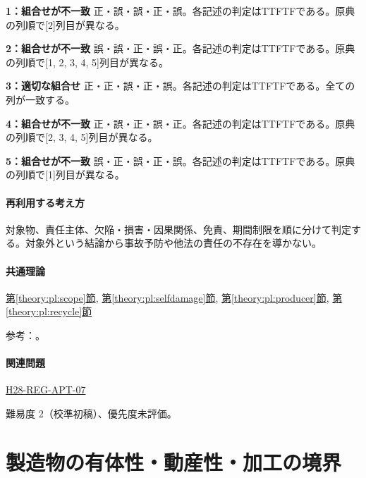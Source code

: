 \noindent\textbf{1：組合せが不一致} 正・誤・誤・正・誤。各記述の判定はTTFTFである。原典の列順で[2]列目が異なる。\par

\noindent\textbf{2：組合せが不一致} 誤・誤・正・誤・正。各記述の判定はTTFTFである。原典の列順で[1, 2, 3, 4, 5]列目が異なる。\par

\noindent\textbf{3：適切な組合せ} 正・正・誤・正・誤。各記述の判定はTTFTFである。全ての列が一致する。\par

\noindent\textbf{4：組合せが不一致} 正・誤・正・誤・正。各記述の判定はTTFTFである。原典の列順で[2, 3, 4, 5]列目が異なる。\par

\noindent\textbf{5：組合せが不一致} 誤・正・誤・正・誤。各記述の判定はTTFTFである。原典の列順で[1]列目が異なる。\par

\paragraph{再利用する考え方} 対象物、責任主体、欠陥・損害・因果関係、免責、期間制限を順に分けて判定する。対象外という結論から事故予防や他法の責任の不存在を導かない。

\paragraph{共通理論} \hyperref[theory:pl:scope]{第\ref*{theory:pl:scope}節}, \hyperref[theory:pl:selfdamage]{第\ref*{theory:pl:selfdamage}節}, \hyperref[theory:pl:producer]{第\ref*{theory:pl:producer}節}, \hyperref[theory:pl:recycle]{第\ref*{theory:pl:recycle}節}

\par 参考：\cite{pl_statute,pl_qa,pl_definitions2018}。

\paragraph{関連問題} \hyperref[q:h28-reg-apt-07]{H28-REG-APT-07}

\par 難易度 2（校準初稿）、優先度未評価。

\section{製造物の有体性・動産性・加工の境界}

